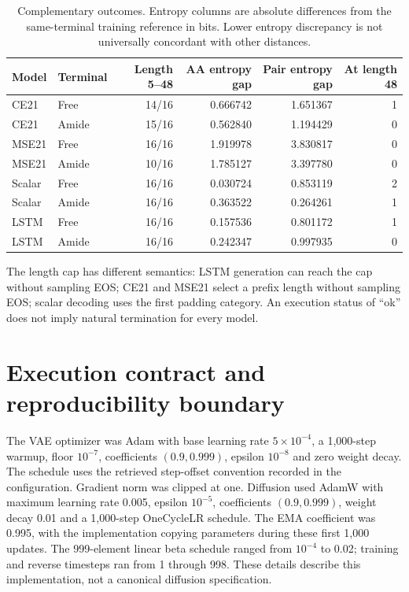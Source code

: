 \documentclass[12pt,a4paper]{article}
\begin{document}
\begin{table}[htbp]\centering\singlespacing\small
\caption{Complementary outcomes. Entropy columns are absolute differences from the same-terminal training reference in bits. Lower entropy discrepancy is not universally concordant with other distances.}
\begin{tabular}{llrrrr}\toprule
Model & Terminal & Length 5--48 & AA entropy gap & Pair entropy gap & At length 48\\\midrule
CE21 & Free & 14/16 & 0.666742 & 1.651367 & 1\\
CE21 & Amide & 15/16 & 0.562840 & 1.194429 & 0\\
MSE21 & Free & 16/16 & 1.919978 & 3.830817 & 0\\
MSE21 & Amide & 10/16 & 1.785127 & 3.397780 & 0\\
Scalar & Free & 16/16 & 0.030724 & 0.853119 & 2\\
Scalar & Amide & 16/16 & 0.363522 & 0.264261 & 1\\
LSTM & Free & 16/16 & 0.157536 & 0.801172 & 1\\
LSTM & Amide & 16/16 & 0.242347 & 0.997935 & 0\\\bottomrule
\end{tabular}\end{table}
The length cap has different semantics: LSTM generation can reach the cap without sampling EOS; CE21 and MSE21 select a prefix length without sampling EOS; scalar decoding uses the first padding category. An execution status of ``ok'' does not imply natural termination for every model.

\section{Execution contract and reproducibility boundary}
The VAE optimizer was Adam with base learning rate $5\times10^{-4}$, a 1,000-step warmup, floor $10^{-7}$, coefficients $(0.9,0.999)$, epsilon $10^{-8}$ and zero weight decay. The schedule uses the retrieved step-offset convention recorded in the configuration. Gradient norm was clipped at one. Diffusion used AdamW with maximum learning rate 0.005, epsilon $10^{-5}$, coefficients $(0.9,0.999)$, weight decay 0.01 and a 1,000-step OneCycleLR schedule. The EMA coefficient was 0.995, with the implementation copying parameters during these first 1,000 updates. The 999-element linear beta schedule ranged from $10^{-4}$ to 0.02; training and reverse timesteps ran from 1 through 998. These details describe this implementation, not a canonical diffusion specification.
\end{document}
